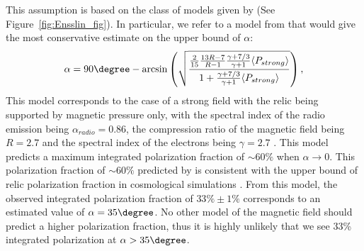 \documentclass[letterpaper,useAMS,usenatbib]{mn2e}
\begin{document}
This assumption is based on the class of models given by \cite{E98}(See
Figure~\ref{fig:Ensslin_fig}). In particular, we refer to a model from \cite{E98} 
that would give the most
conservative estimate on the upper bound of $\alpha$:
\begin{equation}
	\alpha = 90 \degree - \arcsin \left( \sqrt{\frac{\frac{2}{15} \frac{13R -
	7}{R - 1} \frac{\gamma + 7/3}{\gamma + 1} \langle P_{strong} \rangle}{1 +
		\frac{\gamma + 7/3}{\gamma +1} \langle P_{strong} \rangle
	}}\right),\label{eqn:Ensslin_model}
\end{equation}
This model corresponds to the case of a strong field with the relic being supported by
magnetic pressure only, with the spectral index of the radio
emission being $\alpha_{radio} = 0.86$, the compression ratio of the
magnetic field being
$R=2.7$ and the spectral index of the electrons being $\gamma = 2.7$
\citep{L13}. 
This model predicts a maximum integrated polarization fraction 
 of
$\sim60\%$ when $\alpha \rightarrow 0$. 
This  polarization fraction of $\sim60\%$ predicted by \citep{E98} is
consistent with the upper bound of relic polarization fraction in cosmological
simulations \citep{S13}. From this model, the
observed integrated polarization fraction of $33\%\pm1\%$ corresponds to an estimated value
of $\alpha  = 35\degree$. 
No other model of the magnetic field should predict 
a higher polarization fraction, thus it is highly unlikely that we see 33\%
integrated polarization at $\alpha > 35\degree$.  
\par
\end{document}
